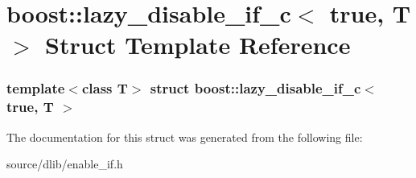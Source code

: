 \hypertarget{structboost_1_1lazy__disable__if__c_3_01true_00_01T_01_4}{
\section{boost::lazy\_\-disable\_\-if\_\-c$<$ true, T $>$ Struct Template Reference}
\label{structboost_1_1lazy__disable__if__c_3_01true_00_01T_01_4}
}
\subsubsection*{template$<$class T$>$ struct boost::lazy\_\-disable\_\-if\_\-c$<$ true, T $>$}



The documentation for this struct was generated from the following file:\begin{DoxyCompactItemize}
\item 
source/dlib/enable\_\-if.h\end{DoxyCompactItemize}

